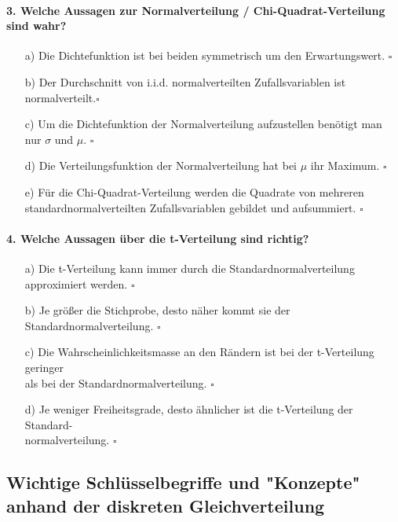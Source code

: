 \documentclass[a4paper]{article}
\begin{document}
\paragraph{3. Welche Aussagen zur Normalverteilung / Chi-Quadrat-Verteilung sind wahr?}
\begin{itemize}
    \item[a)] Die Dichtefunktion ist bei beiden symmetrisch um den Erwartungswert. \hfill $\square$
    \item[b)] Der Durchschnitt von i.i.d. normalverteilten Zufallsvariablen ist normalverteilt.\hfill $\square$ 
    \item[c)] Um die Dichtefunktion der Normalverteilung aufzustellen benötigt man nur $\sigma$ und $\mu$. \hfill $\square$
    \item[d)] Die Verteilungsfunktion der Normalverteilung hat bei $\mu$ ihr Maximum. \hfill $\square$
    \item[e)] Für die Chi-Quadrat-Verteilung werden die Quadrate von mehreren\\ standardnormalverteilten Zufallsvariablen gebildet und aufsummiert. \hfill $\square$
\end{itemize}

\paragraph{4. Welche Aussagen über die t-Verteilung sind richtig?}
\begin{itemize}
    \item[a)] Die t-Verteilung kann immer durch die Standardnormalverteilung approximiert werden. \hfill $\square$
    \item[b)] Je größer die Stichprobe, desto näher kommt sie der Standardnormalverteilung. \hfill $\square$
    \item[c)] Die Wahrscheinlichkeitsmasse an den Rändern ist bei der t-Verteilung geringer \\als bei der Standardnormalverteilung. \hfill $\square$
    \item[d)] Je weniger Freiheitsgrade, desto ähnlicher ist die t-Verteilung der Standard-\\normalverteilung. \hfill $\square$
\end{itemize}

\clearpage

\subsection{Wichtige Schlüsselbegriffe und "Konzepte" anhand der diskreten Gleichverteilung} \label{sec:concept}
\end{document}
